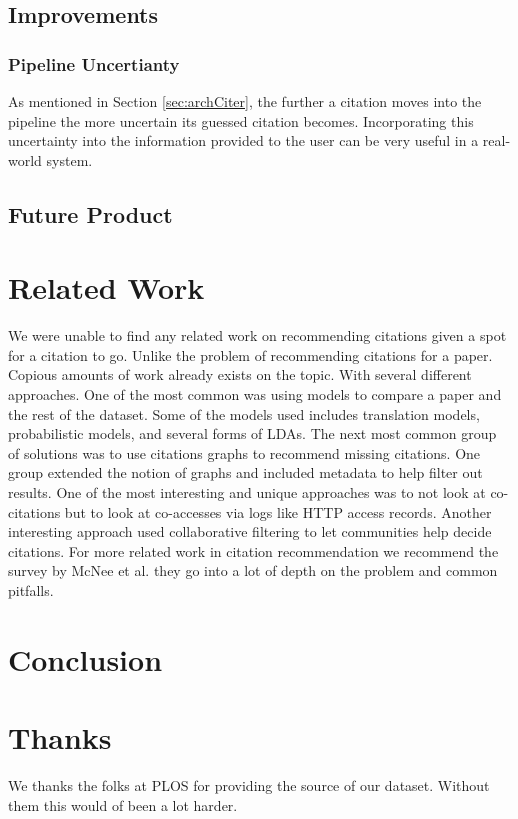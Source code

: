 \documentclass[10pt, conference, compsocconf]{IEEEtran}
\begin{document}
\subsection{Improvements}

\subsubsection{Pipeline Uncertianty}
As mentioned in Section \ref{sec:archCiter}, the further a citation moves into the pipeline the more uncertain its guessed citation becomes.
Incorporating this uncertainty into the information provided to the user can be very useful in a real-world system.

\subsection{Future Product}

\section{Related Work}\label{sec:related}
We were unable to find any related work on recommending citations given a spot for a citation to go. Unlike the problem of recommending citations for a paper. Copious amounts of work already exists on the topic. With several different approaches. One of the most common was using models to compare a paper and the rest of the dataset. Some of the models used includes translation models, probabilistic models, and several forms of LDAs.\cite{cite1, cite2, cite3} The next most common group of solutions was to use citations graphs to recommend missing citations.\cite{cite6} One group extended the notion of graphs and included metadata to help filter out results.\cite{cite4} One of the most 
interesting and unique approaches was to not look at co-citations but to look at co-accesses via logs like HTTP access records.\cite{cite7}
Another interesting approach used collaborative filtering to let communities help decide citations.\cite{cite8} For more related work in
citation recommendation we recommend the survey by McNee et al. they go into a lot of depth on the problem and common pitfalls.\cite{cite5}

\section{Conclusion}\label{sec:conclusion}

\section{Thanks}
We thanks the folks at PLOS for providing the source of our dataset. Without them this would of been a lot harder.



\end{document}
